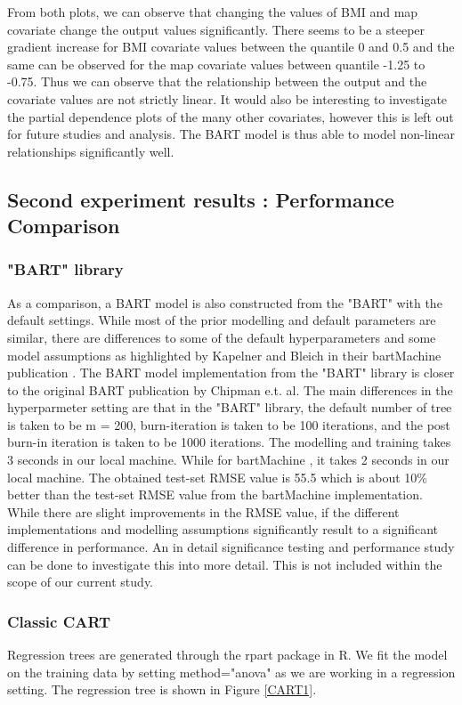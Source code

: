 \documentclass{usiinftr}
\begin{document}
From both plots, we can observe that changing the values of BMI and map covariate change the output values significantly. There seems to be a steeper gradient increase for BMI covariate values between the quantile 0 and 0.5 and the same can be observed for the map covariate values between quantile -1.25 to -0.75. Thus we can observe that the relationship between the output and the covariate values are not strictly linear. It would also be interesting to investigate the partial dependence plots of the many other covariates, however this is left out for future  studies and analysis. The BART model is thus able to model non-linear relationships significantly well. 

\subsection{Second experiment results : Performance Comparison}
\subsubsection{"BART" library}
As a comparison, a BART model is also constructed from the "BART" with the default settings. While most of the prior modelling and default parameters are similar, there are differences to some of the default hyperparameters and some model assumptions as highlighted by Kapelner and Bleich in their bartMachine publication \cite{11}. The BART model implementation from the "BART" library is closer to the original BART publication by Chipman e.t. al. The main differences in the hyperparmeter setting are that in the "BART" library, the default number of tree is taken to be m = 200, burn-iteration is taken to be 100 iterations, and the post burn-in iteration is taken to be 1000 iterations. The modelling and training takes 3 seconds in our local machine. While for bartMachine , it takes 2 seconds in our local machine. The obtained test-set RMSE value is 55.5 which is about 10\% better than the test-set RMSE value from the bartMachine implementation. While there are slight improvements in the RMSE value, if the different implementations and modelling assumptions significantly result to a significant difference in performance. An in detail significance testing and performance study can be done to investigate this into more detail. This is not included within the scope of our current study.

\subsubsection{Classic CART}
Regression trees are generated through the rpart package in R. We fit the model on the training data by setting method="anova" as we are working in a regression setting. The regression tree is shown in Figure \ref{CART1}. 
\end{document}
